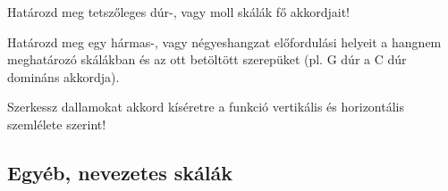 \begin{practices}
\item Határozd meg tetszőleges dúr-, vagy moll skálák fő akkordjait!
\item Határozd meg egy hármas-, vagy négyeshangzat előfordulási helyeit a hangnem meghatározó
skálákban és az ott betöltött szerepüket (pl. G dúr a C dúr domináns akkordja).
\item Szerkessz dallamokat akkord kíséretre a funkció vertikális és horizontális szemlélete szerint!
\end{practices}

\subsection{Egyéb, nevezetes skálák}

